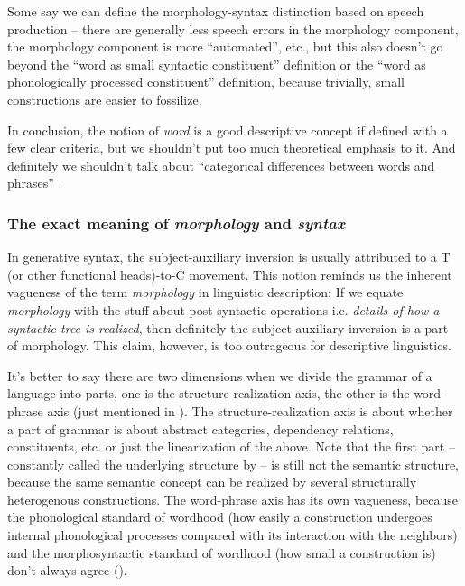 \documentclass[UTF8, a4paper, oneside, scheme=plain]{ctexrep}
\newcommand*{\term}[1]{\emph{#1}}
\begin{document}
Some say we can define the morphology-syntax distinction based on speech production -- 
there are generally less speech errors in the morphology component,
the morphology component is more ``automated'', etc.,
but this also doesn't go beyond the ``word as small syntactic constituent'' definition 
or the ``word as phonologically processed constituent'' definition,
because trivially, small constructions are easier to fossilize.

In conclusion, the notion of \term{word} is a good descriptive concept
if defined with a few clear criteria,
but we shouldn't put too much theoretical emphasis to it.
And definitely we shouldn't talk about ``categorical differences between words and phrases'' 
\citep{bruening2018lexicalist}.

\subsubsection{The exact meaning of \term{morphology} and \term{syntax}}\label{sec:morphology-meaning}

In generative syntax, the subject-auxiliary inversion is usually attributed to 
a T (or other functional heads)-to-C movement.
This notion reminds us the inherent vagueness of the term \term{morphology} in linguistic description:
If we equate \term{morphology} with the stuff about post-syntactic operations 
i.e. \emph{details of how a syntactic tree is realized},
then definitely the subject-auxiliary inversion is a part of morphology.
This claim, however, is too outrageous for descriptive linguistics.

It's better to say there are two dimensions 
when we divide the grammar of a language into parts,
one is the structure-realization axis,
the other is the word-phrase axis
(just mentioned in ).
The structure-realization axis is about 
whether a part of grammar is about abstract categories, dependency relations, constituents, etc. 
or just the linearization of the above.
Note that the first part -- constantly called the underlying structure by \citet{dixon2009basic1} 
-- is still not the semantic structure,
because the same semantic concept can be realized by several structurally heterogenous constructions.
The word-phrase axis has its own vagueness,
because the phonological standard of wordhood 
(how easily a construction undergoes internal phonological processes 
compared with its interaction with the neighbors)
and the morphosyntactic standard of wordhood 
(how small a construction is)
don't always agree ().
\end{document}
